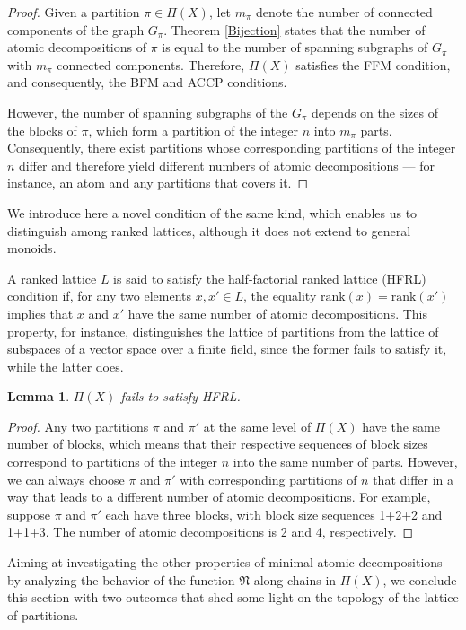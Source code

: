 \documentclass[12pt]{extarticle}
\newtheorem{Lemma}{Lemma}
\begin{document}
\begin{proof}
  Given a partition $\pi\in\Pi(X)$, let $m_{\pi}$ denote the number of connected components of the graph $G_{\pi}$. Theorem \ref{Bijection} states that the number of atomic decompositions of $\pi$ is equal to the number of spanning subgraphs of $G_{\pi}$ with $m_{\pi}$ connected components. Therefore, $\Pi(X)$ satisfies the FFM condition, and consequently, the BFM and ACCP conditions. 
  
  However, the number of spanning subgraphs of the $G_{\pi}$ depends on the sizes of the blocks of $\pi$, which form a partition of the integer $n$ into $m_{\pi}$ parts. Consequently, there exist partitions whose corresponding partitions of the integer $n$ differ and therefore yield different numbers of atomic decompositions --- for instance, an atom and any partitions that covers it.
\end{proof}

We introduce here a novel condition of the same kind, which enables us to distinguish among ranked lattices, although it does not extend to general monoids.

A ranked lattice $L$ is said to satisfy the half-factorial ranked lattice (HFRL) condition if, for any two elements $x,x'\in L$, the equality $\text{rank}(x)=\text{rank}(x')$ implies that $x$ and $x'$ have the same number of atomic decompositions. This property, for instance, distinguishes the lattice of partitions from the lattice of subspaces of a vector space over a finite field, since the former fails to satisfy it, while the latter does.  

\begin{Lemma} $\Pi(X)$ fails to satisfy HFRL.
	\end{Lemma}
	\begin{proof}
		Any two partitions $\pi$ and $\pi'$ at the same level of $\Pi(X)$ have the same number of blocks, which means that their respective sequences of block sizes correspond to partitions of the integer $n$ into the same number of parts. However, we can always choose $\pi$ and $\pi'$ with corresponding partitions of $n$ that differ in a way that leads to a different number of atomic decompositions. For example, suppose $\pi$ and $\pi'$ each have three blocks, with block size sequences 1+2+2 and 1+1+3. The number of atomic decompositions is 2 and 4, respectively.
	\end{proof}

	Aiming at investigating the other properties of minimal atomic decompositions by analyzing the behavior of the function $\mathfrak{N}$ along chains in $\Pi(X)$, we conclude this section with two outcomes that shed some light on the topology of the lattice of partitions.
	
\end{document}
